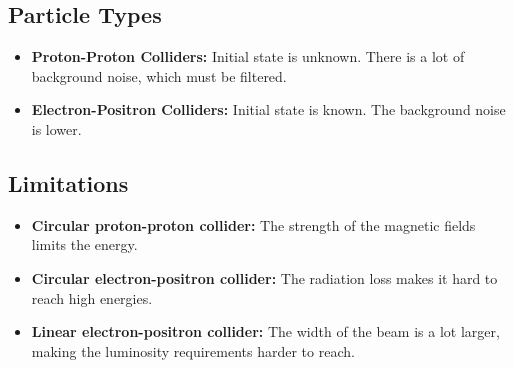 \subsection{Particle Types}
\begin{itemize}
    \item \textbf{Proton-Proton Colliders:} Initial state is unknown. There is a lot of background noise, which must be filtered.
    \item \textbf{Electron-Positron Colliders:} Initial state is known. The background noise is lower.
\end{itemize}


\subsection{Limitations}
\begin{itemize}
    \item \textbf{Circular proton-proton collider:} The strength of the magnetic fields limits the energy.  
    \item \textbf{Circular electron-positron collider:} The radiation loss makes it hard to reach high energies.
    \item \textbf{Linear electron-positron collider:} The width of the beam is a lot larger, making the luminosity requirements harder to reach.
\end{itemize}

